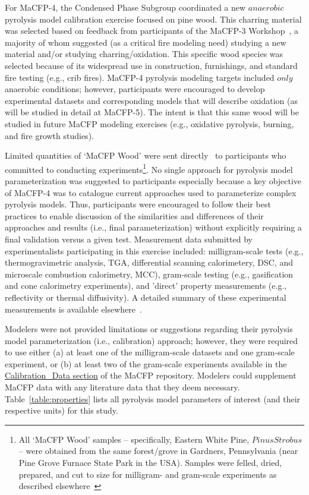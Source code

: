 \documentclass{article}
\begin{document}
For MaCFP-4, the Condensed Phase Subgroup coordinated a new $anaerobic$ pyrolysis model calibration exercise focused on pine wood. This charring material was selected based on feedback from participants of the MaCFP-3 Workshop~\cite{MaCFP3Proceedings}, a majority of whom suggested (as a critical fire modeling need) studying a new material and/or studying charring/oxidation. This specific wood species was selected because of its widespread use in construction, furnishings, and standard fire testing (e.g., crib fires). MaCFP-4 pyrolysis modeling targets included $only$ anaerobic conditions; however, participants were encouraged to develop experimental datasets and corresponding models that will describe oxidation (as will be studied in detail at MaCFP-5). The intent is that this same wood will be studied in future MaCFP modeling exercises (e.g., oxidative pyrolysis, burning, and fire growth studies).

Limited quantities of `MaCFP Wood' were sent directly~\cite{MaCFP4Guidelines} to participants who committed to conducting experiments\footnote{All `MaCFP Wood' samples -- specifically, Eastern White Pine, $Pinus Strobus$ -- were obtained from the same forest/grove in Gardners, Pennsylvania (near Pine Grove Furnace State Park in the USA). Samples were felled, dried, prepared, and cut to size for milligram- and gram-scale experiments as described elsewhere~\cite{MaCFP4PyrolysisExp}}. No single approach for pyrolysis model parameterization was  suggested to participants especially because a key objective of MaCFP-4 was to catalogue current approaches used to parameterize complex pyrolysis models. Thus, participants were encouraged to follow their best practices to enable discussion of the similarities and differences of their approaches and results (i.e., final parameterization) without explicitly requiring a final validation versus a given test. Measurement data submitted by experimentalists participating in this exercise included: milligram-scale tests (e.g., thermogravimetric analysis, TGA, differential scanning calorimetery, DSC, and microscale combustion calorimetry, MCC), gram-scale testing (e.g., gasification and cone calorimetry experiments), and 'direct' property measurements (e.g., reflectivity or thermal diffusivity). A detailed summary of these experimental measurements is available elsewhere~\cite{MaCFP4PyrolysisExp}.

Modelers were not provided limitations or suggestions regarding their pyrolysis model parameterization (i.e., calibration) approach; however, they were required to use either (a) at least one of the milligram-scale datasets and one gram-scale experiment, or (b) at least two of the gram-scale experiments available in the \href{https://github.com/MaCFP/matl-db/tree/master/Wood/Calibration_Data}{Calibration\_Data section} of the MaCFP repository. Modelers could supplement MaCFP data with any literature data that they deem necessary. Table~\ref{table:properties} lists all pyrolysis model parameters of interest (and their respective units) for this study.
\end{document}
